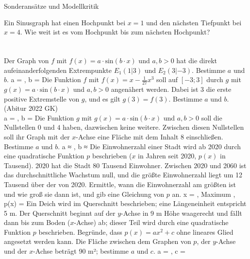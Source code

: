 \setcounter{aufgabe}{13}

\begin{aufgabe}{Sonderansätze und Modellkritik}
\begin{teile}
\teil Ein Sinusgraph hat einen Hochpunkt bei $x = 1$ und den nächsten Tiefpunkt bei $x = 4$. Wie weit ist es vom Hochpunkt bis zum nächsten Hochpunkt? \\  \\  \\ 
\teil Der Graph von $f$ mit $f(x) = a \cdot \mathrm{sin}(b \cdot x)$ und $a, b > 0$ hat die direkt aufeinanderfolgenden Extrempunkte $E_1(1|3)$ und $E_2(3|-3)$. Bestimme $a$ und $b$. a = \leerfeld , b = \leerfeld
\teil Die Funktion $f$ mit $f(x) = x - \frac{1}{27}x^3$ soll auf $[-3; 3]$ durch $g$ mit $g(x) = a \cdot \mathrm{sin}(b \cdot x)$ und $a, b > 0$ angenähert werden. Dabei ist $3$ die erste positive Extremstelle von $g$, und es gilt $g(3) = f(3)$. Bestimme $a$ und $b$. \hfill (Abitur 2022 GK) \\ a = \leerfeld , b = \leerfeld
\teil Die Funktion $g$ mit $g(x) = a \cdot \mathrm{sin}(b \cdot x)$ und $a, b > 0$ soll die Nullstellen $0$ und $4$ haben, dazwischen keine weitere. Zwischen diesen Nullstellen soll ihr Graph mit der $x$-Achse eine Fläche mit dem Inhalt 8 einschließen. Bestimme $a$ und $b$. a ≈ \leerfeld , b ≈ \leerfeld
\teil Die Einwohnerzahl einer Stadt wird ab 2020 durch eine quadratische Funktion $p$ beschrieben ($x$ in Jahren seit 2020, $p(x)$ in Tausend). 2020 hat die Stadt 80 Tausend Einwohner. Zwischen 2020 und 2060 ist das durchschnittliche Wachstum null, und die größte Einwohnerzahl liegt um 12 Tausend über der von 2020. Ermittle, wann die Einwohnerzahl am größten ist und wie groß sie dann ist, und gib eine Gleichung von $p$ an. x = \leerfeld , Maximum \leerfeld , p(x) = \leerfeld
\teil Ein Deich wird im Querschnitt beschrieben; eine Längeneinheit entspricht 5 m. Der Querschnitt beginnt auf der $y$-Achse in 9 m Höhe waagerecht und fällt dann bis zum Boden ($x$-Achse) ab; dieser Teil wird durch eine quadratische Funktion $p$ beschrieben. Begründe, dass $p(x) = ax^2 + c$ ohne lineares Glied angesetzt werden kann. Die Fläche zwischen dem Graphen von $p$, der $y$-Achse und der $x$-Achse beträgt 90 m²; bestimme $a$ und $c$. a = \leerfeld , c = \leerfeld

\end{teile}
\end{aufgabe}
